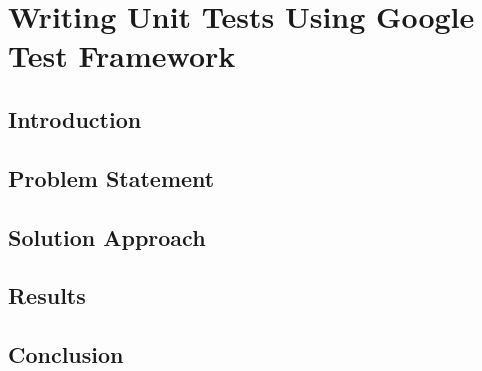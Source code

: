\chapter{Writing Unit Tests Using Google Test Framework}

\section{Introduction}
\lipsum[1-2] %

\section{Problem Statement}
\lipsum[3] %

\section{Solution Approach}
\lipsum[4] %

\section{Results}
\lipsum[5] %

\section{Conclusion}
\lipsum[6] %
